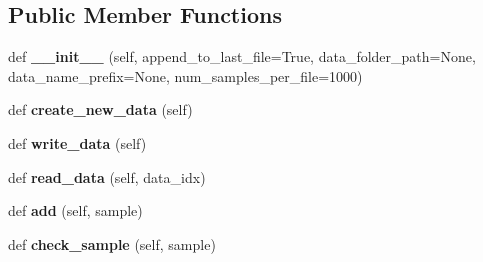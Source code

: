 \subsection*{Public Member Functions}
\begin{DoxyCompactItemize}
\item 
\hypertarget{classaml__data__collec__utils_1_1core_1_1data__manager_1_1_data_manager_a8d5f6c2f2dd6e9fd067a140cea2a0904}{}\label{classaml__data__collec__utils_1_1core_1_1data__manager_1_1_data_manager_a8d5f6c2f2dd6e9fd067a140cea2a0904} 
def {\bfseries \+\_\+\+\_\+init\+\_\+\+\_\+} (self, append\+\_\+to\+\_\+last\+\_\+file=True, data\+\_\+folder\+\_\+path=None, data\+\_\+name\+\_\+prefix=None, num\+\_\+samples\+\_\+per\+\_\+file=1000)
\item 
\hypertarget{classaml__data__collec__utils_1_1core_1_1data__manager_1_1_data_manager_a00b3fe4436da3dae9419a8064c5ad9ca}{}\label{classaml__data__collec__utils_1_1core_1_1data__manager_1_1_data_manager_a00b3fe4436da3dae9419a8064c5ad9ca} 
def {\bfseries create\+\_\+new\+\_\+data} (self)
\item 
\hypertarget{classaml__data__collec__utils_1_1core_1_1data__manager_1_1_data_manager_a9c7fab4029e1390f60b365facf106769}{}\label{classaml__data__collec__utils_1_1core_1_1data__manager_1_1_data_manager_a9c7fab4029e1390f60b365facf106769} 
def {\bfseries write\+\_\+data} (self)
\item 
\hypertarget{classaml__data__collec__utils_1_1core_1_1data__manager_1_1_data_manager_a9c779a3c3c8f33aa4a7600241189d148}{}\label{classaml__data__collec__utils_1_1core_1_1data__manager_1_1_data_manager_a9c779a3c3c8f33aa4a7600241189d148} 
def {\bfseries read\+\_\+data} (self, data\+\_\+idx)
\item 
\hypertarget{classaml__data__collec__utils_1_1core_1_1data__manager_1_1_data_manager_a4b3e831e21430aee28b787639de33a07}{}\label{classaml__data__collec__utils_1_1core_1_1data__manager_1_1_data_manager_a4b3e831e21430aee28b787639de33a07} 
def {\bfseries add} (self, sample)
\item 
\hypertarget{classaml__data__collec__utils_1_1core_1_1data__manager_1_1_data_manager_a2734742ce00fa78fe05b00d3a51e686f}{}\label{classaml__data__collec__utils_1_1core_1_1data__manager_1_1_data_manager_a2734742ce00fa78fe05b00d3a51e686f} 
def {\bfseries check\+\_\+sample} (self, sample)
\item 
\hypertarget{classaml__data__collec__utils_1_1core_1_1data__manager_1_1_data_manager_ac5d20597c5c48f3da59959be9a4a403f}{}\label{classaml__data__collec__utils_1_1core_1_1data__manager_1_1_data_manager_ac5d20597c5c48f3da59959be9a4a403f} 

\end{DoxyCompactItemize}
